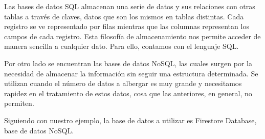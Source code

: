 	Las bases de datos SQL almacenan una serie de datos y sus relaciones con otras tablas a través de claves, datos que son los mismos en tablas distintas. Cada registro se ve representado por filas mientras que las columnas representan los campos de cada registro. Esta filosofía de almacenamiento nos permite acceder de manera sencilla a cualquier dato. Para ello, contamos con el lenguaje SQL.
	
	Por otro lado se encuentran las bases de datos NoSQL, las cuales surgen por la necesidad de almacenar la información sin seguir una estructura determinada. Se utilizan cuando el número de datos a albergar es muy grande y necesitamos rapidez en el tratamiento de estos datos, cosa que las anteriores, en general, no permiten.
	
	Siguiendo con nuestro ejemplo, la base de datos a utilizar es Firestore Database, base de datos NoSQL.
	